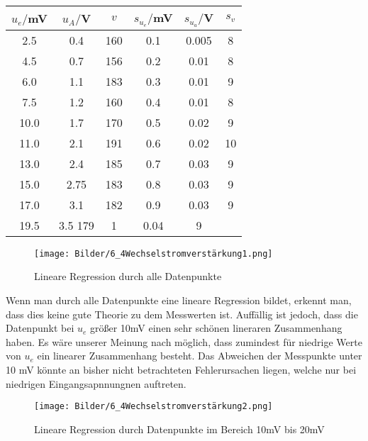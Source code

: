 \begin{table}[h]
    \centering
    \begin{tabular}[h]{c|c|c|c|c|c}


        $u_e/$mV & $u_A/$V & $v$ & $s_{u_e}/$mV&  $s_{u_a}/$V & $s_v$ \\
       \hline
        2.5 & 0.4 & 160 & 0.1 & 0.005 & 8 \\
        4.5 & 0.7 & 156 & 0.2 & 0.01 & 8\\
        6.0 & 1.1 & 183 & 0.3 & 0.01 & 9\\
        7.5 & 1.2 & 160 & 0.4 & 0.01 & 8\\
        10.0 & 1.7 & 170 & 0.5 & 0.02 & 9\\
        11.0 & 2.1 & 191 & 0.6 & 0.02 & 10\\
        13.0 & 2.4 & 185 & 0.7 & 0.03 & 9\\
        15.0 & 2.75 & 183 & 0.8 & 0.03 & 9\\
        17.0 & 3.1 & 182 & 0.9 & 0.03 & 9\\
        19.5 & 3.5 179 & 1 & 0.04 & 9\\

    \end{tabular}
\end{table}
\begin{figure}[h]
    \centering
    \texttt{[image: Bilder/6\_4Wechselstromverstärkung1.png]}
    \caption{Lineare Regression durch alle Datenpunkte}
\end{figure}
Wenn man durch alle Datenpunkte eine lineare Regression bildet, erkennt man, dass dies keine gute Theorie zu dem Messwerten ist.
Auffällig ist jedoch, dass die Datenpunkt bei $u_e$ größer 10mV einen sehr schönen lineraren Zusammenhang haben. 
Es wäre unserer Meinung nach möglich, dass zumindest für niedrige Werte von $u_e$ ein linearer Zusammenhang besteht. 
Das Abweichen der Messpunkte unter 10 mV könnte an bisher nicht betrachteten Fehlerursachen liegen, welche nur bei niedrigen Eingangsapnnungnen auftreten.
\begin{figure}[h]
    \centering
    \texttt{[image: Bilder/6\_4Wechselstromverstärkung2.png]}
    \caption{Lineare Regression durch Datenpunkte im Bereich 10mV bis 20mV}
\end{figure}
